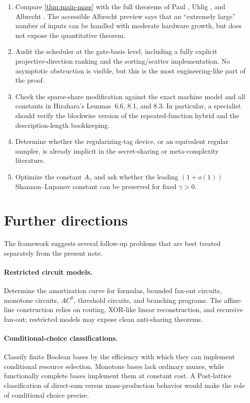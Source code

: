 \documentclass[11pt]{article}
\theoremstyle{definition}
\begin{document}
\begin{enumerate}
\item Compare \cref{thm:main-mass} with the full theorems of Paul \cite{Paul1976}, Uhlig \cite{Uhlig1974,Uhlig1992}, and Albrecht \cite{Albrecht1989}.  The accessible Albrecht preview says that an ``extremely large'' number of inputs can be handled with moderate hardware growth, but does not expose the quantitative theorem.

\item Audit the scheduler at the gate-basis level, including a fully explicit projective-direction ranking and the sorting/scatter implementation.  No asymptotic obstruction is visible, but this is the most engineering-like part of the proof.

\item Check the sparse-share modification against the exact machine model and all constants in Hirahara's Lemmas~6.6, 8.1, and 8.3.  In particular, a specialist should verify the blockwise version of the repeated-function hybrid and the description-length bookkeeping.

\item Determine whether the regularizing-tag device, or an equivalent regular sampler, is already implicit in the secret-sharing or meta-complexity literature.

\item Optimize the constant $A_\gamma$ and ask whether the leading $(1+o(1))$ Shannon--Lupanov constant can be preserved for fixed $\gamma>0$.
\end{enumerate}

\section{Further directions}

The framework suggests several follow-up problems that are best treated separately from the present note.

\paragraph{Restricted circuit models.}
Determine the amortization curve for formulas, bounded fan-out circuits, monotone circuits, $AC^0$, threshold circuits, and branching programs.  The affine-line construction relies on routing, XOR-like linear reconstruction, and recursive fan-out; restricted models may expose clean anti-sharing theorems.

\paragraph{Conditional-choice classifications.}
Classify finite Boolean bases by the efficiency with which they can implement conditional resource selection.  Monotone bases lack ordinary muxes, while functionally complete bases implement them at constant cost.  A Post-lattice classification of direct-sum versus mass-production behavior would make the role of conditional choice precise.
\end{document}
